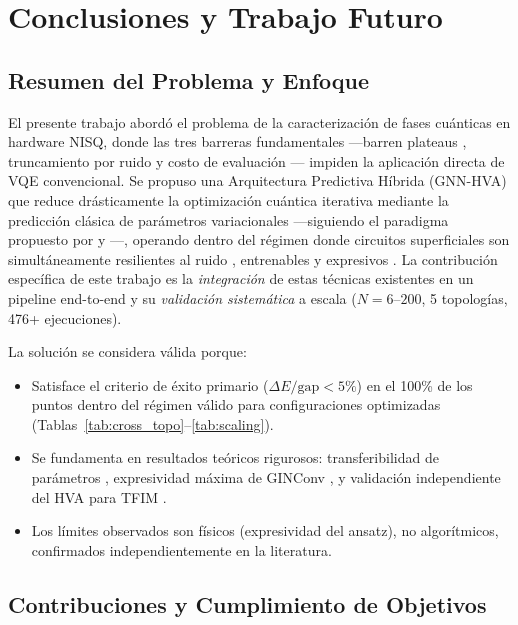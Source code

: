 \documentclass[11pt,a4paper,spanish]{book}
\begin{document}

\chapter{Conclusiones y Trabajo Futuro}

\section{Resumen del Problema y Enfoque}

El presente trabajo abordó el problema de la caracterización de fases cuánticas en hardware NISQ, donde las tres barreras fundamentales ---barren plateaus \citep{mcclean2018}, truncamiento por ruido \citep{mele2026} y costo de evaluación \citep{tilly2022}--- impiden la aplicación directa de VQE convencional. Se propuso una Arquitectura Predictiva Híbrida (GNN-HVA) que reduce drásticamente la optimización cuántica iterativa mediante la predicción clásica de parámetros variacionales ---siguiendo el paradigma propuesto por \citet{miao2024} y \citet{zhang2025}---, operando dentro del régimen donde circuitos superficiales son simultáneamente resilientes al ruido \citep{mele2026}, entrenables \citep{cerezo2021} y expresivos \citep{wiersema2020}. La contribución específica de este trabajo es la \emph{integración} de estas técnicas existentes en un pipeline end-to-end y su \emph{validación sistemática} a escala ($N = 6$--$200$, 5 topologías, 476+ ejecuciones).

La solución se considera válida porque:
\begin{itemize}
    \item Satisface el criterio de éxito primario ($\Delta E/\text{gap} < 5\%$) en el 100\% de los puntos dentro del régimen válido para configuraciones optimizadas (Tablas~\ref{tab:cross_topo}--\ref{tab:scaling}).
    \item Se fundamenta en resultados teóricos rigurosos: transferibilidad de parámetros \citep{mele2022, puig2025}, expresividad máxima de GINConv \citep{xu2019}, y validación independiente del HVA para TFIM \citep{tripathi2026}.
    \item Los límites observados son físicos (expresividad del ansatz), no algorítmicos, confirmados independientemente en la literatura.
\end{itemize}

\section{Contribuciones y Cumplimiento de Objetivos}
\end{document}
